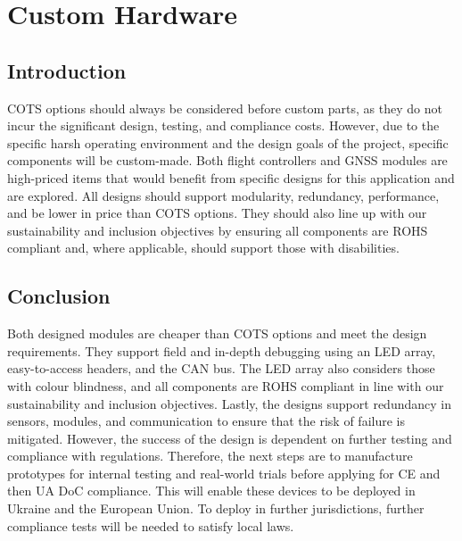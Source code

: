 \newpage
{}
\section{Custom Hardware} \label{section:Custom Hardware}
\subsection{Introduction}\label{sub_section:tgt_custom_hardware_intro}
\gls{COTS} options should always be considered before custom parts, as they do not incur the significant design, testing, and compliance costs. However, due to the specific harsh operating environment and the design goals of the project, specific components will be custom-made. Both flight controllers and \gls{GNSS} modules are high-priced items that would benefit from specific designs for this application and are explored. All designs should support modularity, redundancy, performance, and be lower in price than \gls{COTS} options. They should also line up with our sustainability and inclusion objectives by ensuring all components are \gls{ROHS} compliant and, where applicable, should support those with disabilities.





\subsection{Conclusion}
Both designed modules are cheaper than \gls{COTS} options and meet the design requirements. They support field and in-depth debugging using an \gls{LED} array, easy-to-access headers, and the \gls{CAN} bus. The LED array also considers those with colour blindness, and all components are \gls{ROHS} compliant in line with our sustainability and inclusion objectives. Lastly, the designs support redundancy in sensors, modules, and communication to ensure that the risk of failure is mitigated. However, the success of the design is dependent on further testing and compliance with regulations. Therefore, the next steps are to manufacture prototypes for internal testing and real-world trials before applying for CE and then UA DoC compliance. This will enable these devices to be deployed in Ukraine and the European Union. To deploy in further jurisdictions, further compliance tests will be needed to satisfy local laws. 